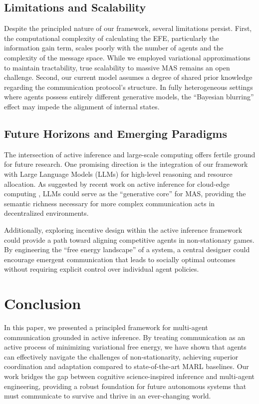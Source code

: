 \subsection{Limitations and Scalability}
Despite the principled nature of our framework, several limitations persist. First, the computational complexity of calculating the EFE, particularly the information gain term, scales poorly with the number of agents and the complexity of the message space. While we employed variational approximations to maintain tractability, true scalability to massive MAS remains an open challenge. Second, our current model assumes a degree of shared prior knowledge regarding the communication protocol's structure. In fully heterogeneous settings where agents possess entirely different generative models, the ``Bayesian blurring'' effect may impede the alignment of internal states.

\subsection{Future Horizons and Emerging Paradigms}
The intersection of active inference and large-scale computing offers fertile ground for future research. One promising direction is the integration of our framework with Large Language Models (LLMs) for high-level reasoning and resource allocation. As suggested by recent work on active inference for cloud-edge computing \cite{ref_new_Largelanguagemo}, LLMs could serve as the ``generative core'' for MAS, providing the semantic richness necessary for more complex communication acts in decentralized environments.

Additionally, exploring incentive design within the active inference framework \cite{ref_new_ActiveInference} could provide a path toward aligning competitive agents in non-stationary games. By engineering the ``free energy landscape'' of a system, a central designer could encourage emergent communication that leads to socially optimal outcomes without requiring explicit control over individual agent policies.

\section{Conclusion}
In this paper, we presented a principled framework for multi-agent communication grounded in active inference. By treating communication as an active process of minimizing variational free energy, we have shown that agents can effectively navigate the challenges of non-stationarity, achieving superior coordination and adaptation compared to state-of-the-art MARL baselines. Our work bridges the gap between cognitive science-inspired inference and multi-agent engineering, providing a robust foundation for future autonomous systems that must communicate to survive and thrive in an ever-changing world.